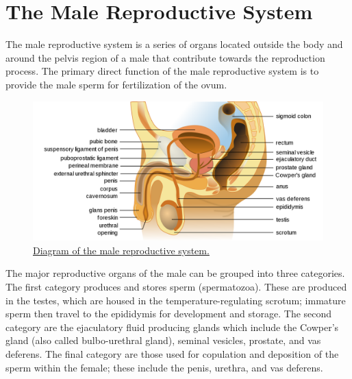 \hypertarget{the-male-reproductive-system}{%
\section{The Male Reproductive System}\label{the-male-reproductive-system}}

The male reproductive system is a series of organs located outside the body and around the pelvis region of a male that contribute towards the reproduction process. The primary direct function of the male reproductive system is to provide the male sperm for fertilization of the ovum.



\begin{figure}

{\centering \includegraphics[width=0.7\linewidth]{./figures/reproductive_system/male anatomy} 

}

\caption{\href{https://commons.wikimedia.org/wiki/File:Male_anatomy_en.svg}{Diagram of the male reproductive system.}}\label{fig:malereproductivesystem}
\end{figure}

The major reproductive organs of the male can be grouped into three categories. The first category produces and stores sperm (spermatozoa). These are produced in the testes, which are housed in the temperature-regulating scrotum; immature sperm then travel to the epididymis for development and storage. The second category are the ejaculatory fluid producing glands which include the Cowper's gland (also called bulbo-urethral gland), seminal vesicles, prostate, and vas deferens. The final category are those used for copulation and deposition of the sperm within the female; these include the penis, urethra, and vas deferens.



